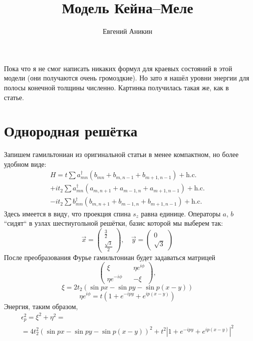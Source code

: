 \documentclass{article}
\title{Модель Кейна--Меле}
\author{Евгений Аникин}
\begin{document}
	\maketitle
	Пока что я не смог написать никаких формул для краевых состояний в этой модели (они
	получаются очень громоздкие). Но зато я нашёл уровни энергии для полосы конечной
	толщины численно. Картинка получилась такая же, как в статье.
	\section{Однородная решётка}
	Запишем гамильтониан из оригинальной статьи в менее компактном, но более удобном виде:
	\begin{multline}
		H = t\sum a_{mn}^\dagger(b_{mn} + b_{m,n-1} + b_{m+1,n-1}) + \mbox{h.c.} \\
		+it_2 \sum a_{mn}^\dagger(a_{m,n+1} + a_{m-1,n} + a_{m+1,n-1}) + \mbox{h.c.} \\
		-it_2 \sum b_{mn}^\dagger(b_{m,n+1} + b_{m-1,n} + b_{m+1,n-1}) + \mbox{h.c.} 
	\end{multline}
	Здесь имеется в виду, что проекция спина $s_z$ равна единице.
	Операторы $a$, $b$ ``сидят`` в узлах шестиугольной решётки, базис которой мы выберем так:
	\begin{equation}
		\vec{x} = \left(\begin{matrix} \frac32 \\ \frac{\sqrt{3}}{2} \end{matrix}\right), \quad
		\vec{y} = \left(\begin{matrix} 0 \\ \sqrt{3} \end{matrix}\right)
	\end{equation}
	После преобразования Фурье гамильтониан будет задаваться матрицей
	\begin{equation}
		\left(
		\begin{matrix}
			\xi && \eta e^{i\phi} \\
			\eta e^{-i\phi} && -\xi
		\end{matrix}
		\right),
	\end{equation}
	\begin{equation}
		\xi = 2t_2 (\sin{px} - \sin{py} - \sin{p(x-y)}) 
	\end{equation}
	\begin{equation}
		\eta e^{i\phi} = t(1 + e^{-ipy} + e^{ip(x-y)}) 
	\end{equation}
	Энергия, таким образом,
	\begin{multline}
		\epsilon_p^2 = \xi^2 + \eta^2 =\\
			= 4t_2^2(\sin{px} - \sin{py} - \sin{p(x-y)})^2 + 
					t^2 |1 + e^{-ipy} + e^{ip(x-y)}|^2
		\label{spectrum}
	\end{multline}
\end{document}
